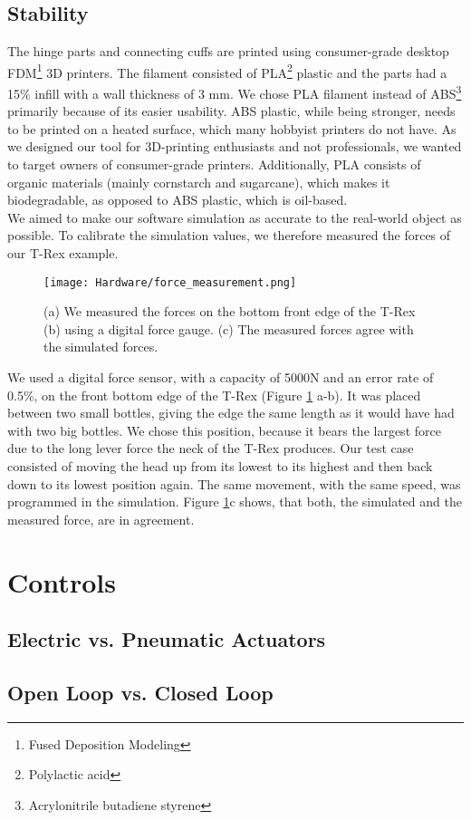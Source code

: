 \subsection{Stability}
The hinge parts and connecting cuffs are printed using consumer-grade desktop FDM\footnote{Fused Deposition Modeling} 3D printers. The filament consisted of PLA\footnote{Polylactic acid} plastic and the parts had a 15\% infill with a wall thickness of 3 mm. We chose PLA filament instead of ABS\footnote{Acrylonitrile butadiene styrene} primarily because of its easier usability. ABS plastic, while being stronger, needs to be printed on a heated surface, which many hobbyist printers do not have. As we designed our tool for 3D-printing enthusiasts and not professionals, we wanted to target owners of consumer-grade printers. Additionally, PLA consists of organic materials (mainly cornstarch and sugarcane), which makes it biodegradable, as opposed to ABS plastic, which is oil-based.\\
We aimed to make our software simulation as accurate to the real-world object as possible. To calibrate the simulation values, we therefore measured the forces of our T-Rex example.\\
\begin{figure}[h!]
    \texttt{[image: Hardware/force\_measurement.png]}
    \centering
    \caption{(a) We measured the forces on the bottom front edge of the T-Rex (b) using a digital force gauge. (c) The measured forces agree with the simulated forces.}
    \label{fig:force_measurement}
\end{figure}
We used a digital force sensor, with a capacity of 5000N and an error rate of 0.5\%, on the front bottom edge of the T-Rex (Figure \ref{fig:force_measurement} a-b). It was placed between two small bottles, giving the edge the same length as it would have had with two big bottles. We chose this position, because it bears the largest force due to the long lever force the neck of the T-Rex produces. Our test case consisted of moving the head up from its lowest to its highest and then back down to its lowest position again. The same movement, with the same speed, was programmed in the simulation. Figure \ref{fig:force_measurement}c shows, that both, the simulated and the measured force, are in agreement.

\section{Controls}

\subsection{Electric vs. Pneumatic Actuators}


\subsection{Open Loop vs. Closed Loop}

